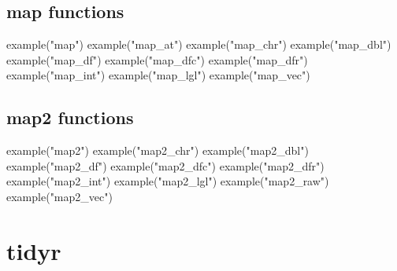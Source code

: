 \documentclass[
]{book}
\newenvironment{Shaded}{\begin{snugshade}}{\end{snugshade}}
\newcommand{\FunctionTok}[1]{\textcolor[rgb]{0.00,0.00,0.00}{#1}}
\newcommand{\NormalTok}[1]{#1}
\newcommand{\StringTok}[1]{\textcolor[rgb]{0.31,0.60,0.02}{#1}}
\begin{document}
\hypertarget{map-functions}{%
\section{map functions}\label{map-functions}}

\begin{Shaded}
\begin{Highlighting}[]
\FunctionTok{example}\NormalTok{(}\StringTok{"map"}\NormalTok{)}
\FunctionTok{example}\NormalTok{(}\StringTok{"map\_at"}\NormalTok{)}
\FunctionTok{example}\NormalTok{(}\StringTok{"map\_chr"}\NormalTok{)}
\FunctionTok{example}\NormalTok{(}\StringTok{"map\_dbl"}\NormalTok{)}
\FunctionTok{example}\NormalTok{(}\StringTok{"map\_df"}\NormalTok{)}
\FunctionTok{example}\NormalTok{(}\StringTok{"map\_dfc"}\NormalTok{)}
\FunctionTok{example}\NormalTok{(}\StringTok{"map\_dfr"}\NormalTok{)}
\FunctionTok{example}\NormalTok{(}\StringTok{"map\_int"}\NormalTok{)}
\FunctionTok{example}\NormalTok{(}\StringTok{"map\_lgl"}\NormalTok{)}
\FunctionTok{example}\NormalTok{(}\StringTok{"map\_vec"}\NormalTok{)}
\end{Highlighting}
\end{Shaded}

\hypertarget{map2-functions}{%
\section{map2 functions}\label{map2-functions}}

\begin{Shaded}
\begin{Highlighting}[]
\FunctionTok{example}\NormalTok{(}\StringTok{"map2"}\NormalTok{)}
\FunctionTok{example}\NormalTok{(}\StringTok{"map2\_chr"}\NormalTok{)}
\FunctionTok{example}\NormalTok{(}\StringTok{"map2\_dbl"}\NormalTok{)}
\FunctionTok{example}\NormalTok{(}\StringTok{"map2\_df"}\NormalTok{)}
\FunctionTok{example}\NormalTok{(}\StringTok{"map2\_dfc"}\NormalTok{)}
\FunctionTok{example}\NormalTok{(}\StringTok{"map2\_dfr"}\NormalTok{)}
\FunctionTok{example}\NormalTok{(}\StringTok{"map2\_int"}\NormalTok{)}
\FunctionTok{example}\NormalTok{(}\StringTok{"map2\_lgl"}\NormalTok{)}
\FunctionTok{example}\NormalTok{(}\StringTok{"map2\_raw"}\NormalTok{)}
\FunctionTok{example}\NormalTok{(}\StringTok{"map2\_vec"}\NormalTok{)}
\end{Highlighting}
\end{Shaded}

\hypertarget{tidyr}{%
\chapter{tidyr}\label{tidyr}}
\end{document}
